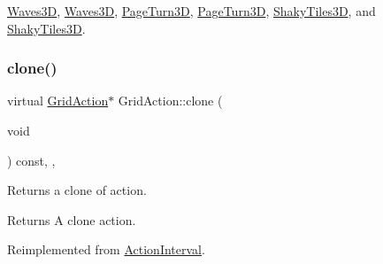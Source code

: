 \hyperlink{classWaves3D_a7f9f49bce0ebd46fc200d208a984b5bf}{Waves3D}, \hyperlink{classWaves3D_ab41b6156741e145fbd6c3626bc16ec25}{Waves3D}, \hyperlink{classPageTurn3D_a4679e461471010cd87932c11be5bef9a}{Page\+Turn3D}, \hyperlink{classPageTurn3D_a98aa1300a97553c4f4185d974021bdc4}{Page\+Turn3D}, \hyperlink{classShakyTiles3D_aefe37a5cda9d6898ad9c573e5a220ce1}{Shaky\+Tiles3D}, and \hyperlink{classShakyTiles3D_ad83d154be5494000eb8fcfe657e503ff}{Shaky\+Tiles3D}.

\mbox{\label{classGridAction_a081a9340e9289cf2dcbb6bde121d4f24}} 
\subsubsection{\texorpdfstring{clone()}{clone()}\hspace{0.1cm}{\footnotesize\ttfamily [2/2]}}
{\footnotesize\ttfamily virtual \hyperlink{classGridAction}{Grid\+Action}$\ast$ Grid\+Action\+::clone (\begin{DoxyParamCaption}\item[{void}]{ }\end{DoxyParamCaption}) const\hspace{0.3cm}{\ttfamily [inline]}, {\ttfamily [override]}, {\ttfamily [virtual]}}

Returns a clone of action.

\begin{DoxyReturn}{Returns}
A clone action. 
\end{DoxyReturn}


Reimplemented from \hyperlink{classActionInterval_abc93ce0c2f54a90eb216a7803f25f44a}{Action\+Interval}.



